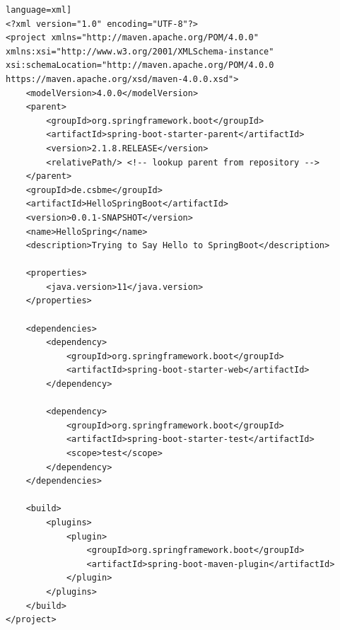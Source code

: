 \documentclass[10pt]{scrartcl}
\begin{document}
\begin{lstlisting}language=xml] 
<?xml version="1.0" encoding="UTF-8"?>
<project xmlns="http://maven.apache.org/POM/4.0.0" xmlns:xsi="http://www.w3.org/2001/XMLSchema-instance"
xsi:schemaLocation="http://maven.apache.org/POM/4.0.0 https://maven.apache.org/xsd/maven-4.0.0.xsd">
	<modelVersion>4.0.0</modelVersion>
	<parent>
		<groupId>org.springframework.boot</groupId>
		<artifactId>spring-boot-starter-parent</artifactId>
		<version>2.1.8.RELEASE</version>
		<relativePath/> <!-- lookup parent from repository -->
	</parent>
	<groupId>de.csbme</groupId>
	<artifactId>HelloSpringBoot</artifactId>
	<version>0.0.1-SNAPSHOT</version>
	<name>HelloSpring</name>
	<description>Trying to Say Hello to SpringBoot</description>

	<properties>
		<java.version>11</java.version>
	</properties>

	<dependencies>
		<dependency>
			<groupId>org.springframework.boot</groupId>
			<artifactId>spring-boot-starter-web</artifactId>
		</dependency>

		<dependency>
			<groupId>org.springframework.boot</groupId>
			<artifactId>spring-boot-starter-test</artifactId>
			<scope>test</scope>
		</dependency>
	</dependencies>

	<build>
		<plugins>
			<plugin>
				<groupId>org.springframework.boot</groupId>
				<artifactId>spring-boot-maven-plugin</artifactId>
			</plugin>
		</plugins>
	</build>
</project>
\end{lstlisting}
\end{document}
